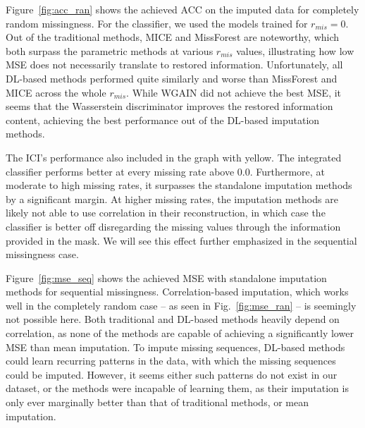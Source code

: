 				Figure~\ref{fig:acc_ran} shows the achieved \ac{ACC} on the imputed data for completely random missingness.
				For the classifier, we used the models trained for $r_{mis} = 0$.
				Out of the traditional methods, \ac{MICE} and MissForest are noteworthy, which both surpass the parametric methods at various $r_{mis}$ values, illustrating how low \ac{MSE} does not necessarily translate to restored information.
				Unfortunately, all \ac{DL}-based methods performed quite similarly and worse than MissForest and \ac{MICE} across the whole $r_{mis}$.
				While \ac{WGAIN} did not achieve the best \ac{MSE}, it seems that the Wasserstein discriminator improves the restored information content, achieving the best performance out of the \ac{DL}-based imputation methods.
				
				The \ac{ICI}'s performance also included in the graph with yellow.
				The integrated classifier performs better at every missing rate above $0.0$.
				Furthermore, at moderate to high missing rates, it surpasses the standalone imputation methods by a significant margin.
				At higher missing rates, the imputation methods are likely not able to use correlation in their reconstruction, in which case the classifier is better off disregarding the missing values through the information provided in the mask.
				We will see this effect further emphasized in the sequential missingness case.
		
				Figure~\ref{fig:mse_seq} shows the achieved \ac{MSE} with standalone imputation methods for sequential missingness.
				Correlation-based imputation, which works well in the completely random case -- as seen in Fig.~\ref{fig:mse_ran} -- is seemingly not possible here.
				Both traditional and \ac{DL}-based methods heavily depend on correlation, as none of the methods are capable of achieving a significantly lower \ac{MSE} than mean imputation.
				To impute missing sequences, \ac{DL}-based methods could learn recurring patterns in the data, with which the missing sequences could be imputed.
				However, it seems either such patterns do not exist in our dataset, or the methods were incapable of learning them, as their imputation is only ever marginally better than that of traditional methods, or mean imputation.
				
